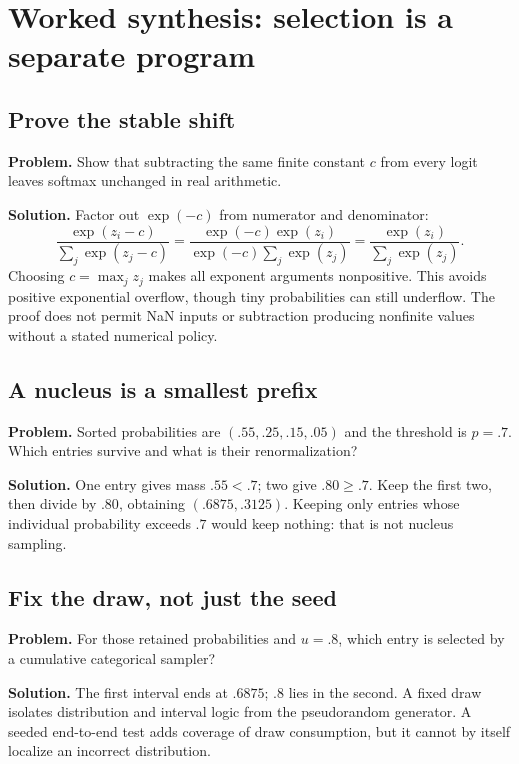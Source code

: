 \section{Worked synthesis: selection is a separate program}
\subsection{Prove the stable shift}
\textbf{Problem.} Show that subtracting the same finite constant $c$ from
every logit leaves softmax unchanged in real arithmetic.

\textbf{Solution.} Factor out $\exp(-c)$ from numerator and denominator:
\begin{equation}
\frac{\exp(z_i-c)}{\sum_j\exp(z_j-c)}
=\frac{\exp(-c)\exp(z_i)}{\exp(-c)\sum_j\exp(z_j)}
=\frac{\exp(z_i)}{\sum_j\exp(z_j)}.
\end{equation}
Choosing $c=\max_jz_j$ makes all exponent arguments nonpositive. This avoids
positive exponential overflow, though tiny probabilities can still underflow.
The proof does not permit NaN inputs or subtraction producing nonfinite values
without a stated numerical policy.

\subsection{A nucleus is a smallest prefix}
\textbf{Problem.} Sorted probabilities are $(.55,.25,.15,.05)$ and the
threshold is $p=.7$. Which entries survive and what is their renormalization?

\textbf{Solution.} One entry gives mass $.55<.7$; two give $.80\geq.7$.
Keep the first two, then divide by $.80$, obtaining $(.6875,.3125)$.
Keeping only entries whose individual probability exceeds $.7$ would keep
nothing: that is not nucleus sampling.

\subsection{Fix the draw, not just the seed}
\textbf{Problem.} For those retained probabilities and $u=.8$, which entry is
selected by a cumulative categorical sampler?

\textbf{Solution.} The first interval ends at $.6875$; $.8$ lies in the second.
A fixed draw isolates distribution and interval logic from the pseudorandom
generator. A seeded end-to-end test adds coverage of draw consumption, but it
cannot by itself localize an incorrect distribution.
